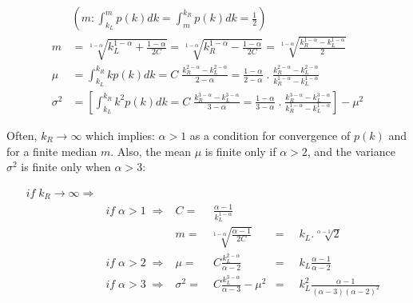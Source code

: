 \documentclass[a4paper, 11pt]{article} %
\begin{document}
\begin{align}\label{eq:md}
	&\left ( m : \int_{k_L}^{m}p(k)dk=\int_{m}^{k_R}p(k)dk=\frac{1}{2} \right )\nonumber\\
	m&=\sqrt[1-\alpha]{k_L^{1-\alpha}+\frac{1-\alpha}{2C}}=
	\sqrt[1-\alpha]{k_R^{1-\alpha}-\frac{1-\alpha}{2C}}=
	\sqrt[1-\alpha]{\frac{k_R^{1-\alpha}-k_L^{1-\alpha}}{2}}\nonumber\\
	\mu &= \int_{k_L}^{k_R}kp(k)dk=C\;\frac{k_R^{2-\alpha}-k_L^{2-\alpha}}{2-\alpha}=\frac{1-\alpha}{2-\alpha}\;.\;\frac{k_R^{2-\alpha}-k_L^{2-\alpha}}{k_R^{1-\alpha}-k_L^{1-\alpha}}\\
	\sigma^2 &= \left[ \int_{k_L}^{k_R}k^2p(k)dk=C\;\frac{k_R^{3-\alpha}-k_L^{3-\alpha}}{3-\alpha} =\frac{1-\alpha}{3-\alpha}\;.\;\frac{k_R^{3-\alpha}-k_L^{3-\alpha}}{k_R^{1-\alpha}-k_L^{1-\alpha}} \right] -\mu^2\nonumber
\end{align}

Often, $k_R\rightarrow \infty$ which implies: $\alpha>1$ as a condition for convergence of $p(k)$ and for a finite median $m$. Also,
the mean $\mu$ is finite only if $\alpha>2$, and the
variance $\sigma^2$ is finite only when $\alpha>3$:

\begin{align}\label{eq:md}
	if \; k_R \rightarrow \infty \Rightarrow & & \nonumber\\
											      & if\; \alpha>1 \;\Rightarrow	& C = &\; \frac{\alpha-1}{k_L^{1-\alpha}}\nonumber\\
										       &  & m  = & \sqrt[1-\alpha]{\frac{\alpha-1}{2C}}&=&\;\;k_L.\sqrt[\alpha-1]{2}&\\
							   & if\; \alpha>2 \;\Rightarrow	& \mu = & \;C\frac{k_L^{2-\alpha}}{\alpha-2}&= &\;\;k_L\frac{\alpha-1}{\alpha-2}& \nonumber\\
							& if\; \alpha>3 \;\Rightarrow	& \sigma^2 = & \;C\frac{k_L^{3-\alpha}}{\alpha-3}-\mu^2&= &\;\;k_L^2\frac{\alpha-1}{(\alpha-3)(\alpha-2)^2}&\nonumber
\end{align}
\end{document}
